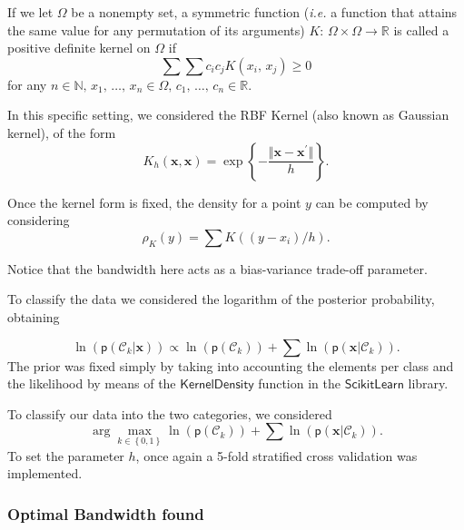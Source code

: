 \documentclass[a4paper]{article}
\begin{document}
If we let $\Omega$ be a nonempty set, a symmetric function (\textit{i.e.}
a function that attains the same value for any permutation of its
arguments) $K:\,\Omega\times\Omega\rightarrow\mathbb{R}$ is called
a positive definite kernel on $\Omega$ if 
\begin{equation}
\sum\sum c_{i}c_{j}K\left(x_{i},\,x_{j}\right)\geq0\label{eq:-15}
\end{equation}
for any $n\in\mathbb{N},\,x_{1},\,\ldots,\,x_{n}\in\Omega,\,c_{1},\,\ldots,\,c_{n}\in\mathbb{R}$.

In this specific setting, we considered the RBF Kernel (also known
as Gaussian kernel), of the form 
\begin{equation}
K_{h}\left(\mathbf{x},\mathbf{x}\right)=\exp\left\{ -\frac{\Vert\mathbf{x}-\mathbf{x^{\prime}}\Vert}{h}\right\} .\label{eq:-16}
\end{equation}

Once the kernel form is fixed, the density for a point $y$ can be
computed by considering 
\[
\rho_{K}\left(y\right)=\sum K\left(\left(y-x_{i}\right)/h\right).
\]

Notice that the bandwidth here acts as a bias-variance trade-off parameter.

To classify the data we considered the logarithm of the posterior
probability, obtaining

\begin{equation}
\ln\left(\mathsf{p}\left(\mathcal{C}_{k}|\mathbf{x}\right)\right)\propto\ln\left(\mathsf{p}\left(\mathcal{C}_{k}\right)\right)+\sum\ln\left(\mathsf{p}\left(\mathbf{x}|\mathcal{C}_{k}\right)\right).\label{eq:-17}
\end{equation}
The prior was fixed simply by taking into accounting the elements
per class and the likelihood by means of the $\mathsf{KernelDensity}$
function in the $\mathsf{ScikitLearn}$ library.

To classify our data into the two categories, we considered 
\begin{equation}
\arg\underset{k\in\left\{ 0,1\right\} }{\max}\ln\left(\mathsf{p}\left(\mathcal{C}_{k}\right)\right)+\sum\ln\left(\mathsf{p}\left(\mathbf{x}|\mathcal{C}_{k}\right)\right).\label{eq:-18}
\end{equation}
To set the parameter $h$, once again a 5-fold stratified cross validation
was implemented.

\subsubsection{Optimal Bandwidth found}
\end{document}
